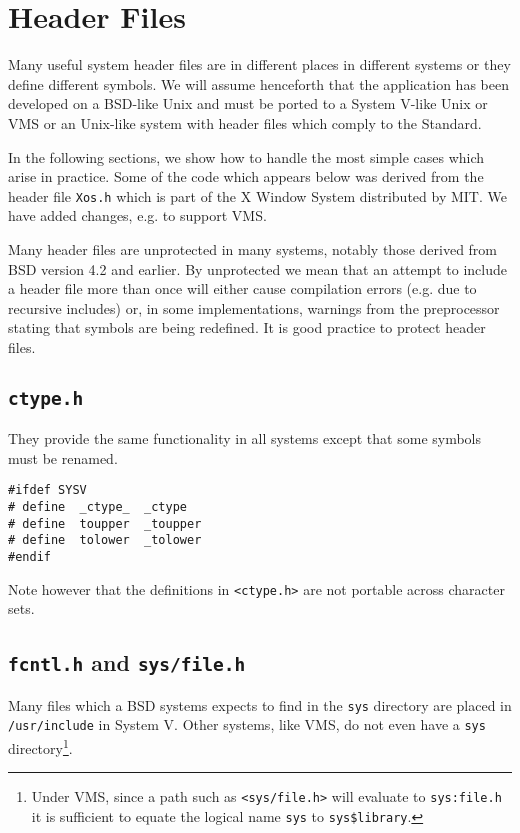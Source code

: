\section{Header Files}

Many useful system header files are in different places in different systems
or they define different symbols. We will assume henceforth that the
application has been developed on a BSD-like Unix and must be ported
to a System V-like Unix or VMS or an Unix-like system with header files
which comply to the Standard.

In the following sections, we show how to handle the most simple cases which
arise in practice. Some of the code which appears below was derived from
the header file {\tt Xos.h} which is part of the X Window System distributed
by MIT. We have added changes, e.g. to support VMS.

Many header files are unprotected in many systems, notably those derived
from BSD version 4.2 and earlier. By unprotected we mean that an attempt
to include a header file more than once will either cause compilation
errors (e.g. due to recursive includes) or,
in some implementations, warnings from the preprocessor stating
that symbols are being redefined. It is good practice to protect header
files.

\subsection{\tt ctype.h}

They provide the same functionality in all systems except that some
symbols must be renamed.

\begin{verbatim}
#ifdef SYSV
# define  _ctype_  _ctype
# define  toupper  _toupper
# define  tolower  _tolower
#endif
\end{verbatim}

Note however that the definitions in {\tt <ctype.h>} are not portable across
character sets.

\subsection{{\tt fcntl.h} and {\tt sys/file.h}}

Many files which a BSD systems expects to find in the {\tt sys}
directory are placed in {\tt /usr/include} in System V. Other systems,
like VMS, do not even have a {\tt sys} directory\footnote{Under VMS,
since a path such as {\tt <sys/file.h>} will evaluate to {\tt sys:file.h}
it is sufficient to equate the logical name {\tt sys} to {\tt sys\$library}.}.


